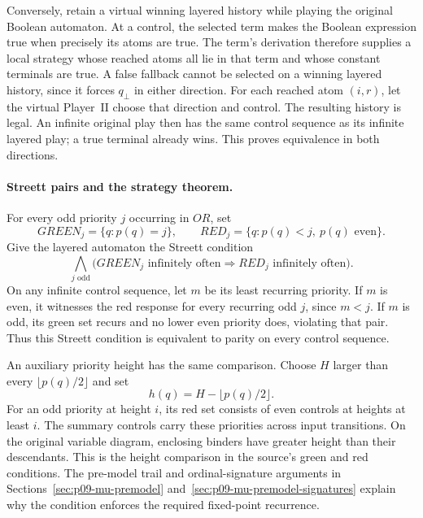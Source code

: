 Conversely, retain a
virtual winning layered
history while playing
the original Boolean
automaton. At a control,
the selected term makes
the Boolean expression
true when precisely its
atoms are true.
The term's derivation
therefore supplies a
local strategy whose
reached atoms all lie
in that term and whose
constant terminals are
true.
A false fallback cannot
be selected on a winning
layered history, since
it forces \(q_\bot\)
in either direction.
For each reached atom
\((i,r)\), let the
virtual Player~II choose
that direction and control.
The resulting history
is legal. An infinite
original play then has
the same control sequence
as its infinite layered
play; a true terminal
already wins.
This proves equivalence
in both directions.

\paragraph{Streett pairs and the strategy theorem.}
For every odd priority
\(j\) occurring in \(OR\),
set
\[
 GREEN_j=\{q:p(q)=j\},\qquad
 RED_j=\{q:p(q)<j,\ p(q)\text{ even}\}.
\]
Give the layered automaton
the Streett condition
\[
 \bigwedge_{j\text{ odd}}
 \bigl(GREEN_j\text{ infinitely often}
       \Longrightarrow RED_j\text{ infinitely often}\bigr).
\]
On any infinite control
sequence, let \(m\)
be its least recurring
priority. If \(m\)
is even, it witnesses
the red response for
every recurring odd \(j\),
since \(m<j\).
If \(m\) is odd,
its green set recurs
and no lower even
priority does, violating
that pair. Thus this
Streett condition is
equivalent to parity
on every control sequence.

An auxiliary priority height
has the same comparison.
Choose \(H\) larger
than every
\(\lfloor p(q)/2\rfloor\)
and set
\[
 h(q)=H-\lfloor p(q)/2\rfloor.
\]
For an odd priority
at height \(i\), its
red set consists of
even controls at heights
at least \(i\).
The summary controls
carry these priorities
across input transitions.
On the original variable
diagram, enclosing binders
have greater height than
their descendants. This
is the height comparison
in the source's green
and red conditions.
The pre-model trail and
ordinal-signature arguments
in Sections~\ref{sec:p09-mu-premodel}
and~\ref{sec:p09-mu-premodel-signatures}
explain why the condition
enforces the required
fixed-point recurrence.

